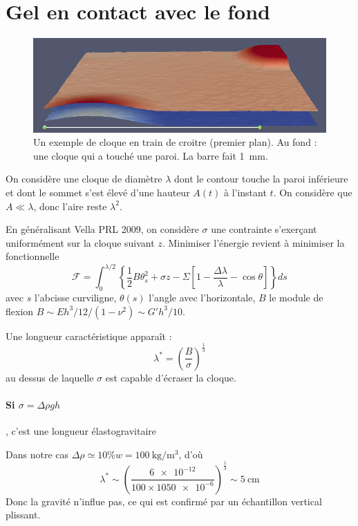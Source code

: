 \documentclass[12pt,a4paper]{article}
\author{Mathieu Leocmach}
\begin{document}
\section{Gel en contact avec le fond}

\begin{figure}
\includegraphics[width=\textwidth]{plots_0117.png}
\caption{Un exemple de cloque en train de croitre (premier plan). Au fond : une cloque qui a touché une paroi. La barre fait \SI{1}{\milli\metre}.}
\end{figure}

On considère une cloque de diamètre $\lambda$ dont le contour touche la paroi inférieure et dont le sommet s'est élevé d'une hauteur $A(t)$ à l'instant $t$. On considère que $A \ll \lambda$, donc l'aire reste $\lambda^2$.

En généralisant Vella PRL 2009, on considère $\sigma$ une contrainte s'exerçant uniformément sur la cloque suivant $z$. Minimiser l'énergie revient à minimiser la fonctionnelle
\begin{equation}
\mathcal{F} = \int_0^{\lambda/2}\left\lbrace\frac{1}{2} B \theta_s^2 + \sigma z - \Sigma \left[1-\frac{\Delta \lambda}{\lambda} - \cos\theta\right] \right\rbrace ds
\end{equation}
avec $s$ l'abcisse curviligne, $\theta(s)$ l'angle avec l'horizontale, $B$ le module de flexion $B \sim E h^3 /12 / (1-\nu^2) \sim G' h^3/10$.

Une longueur caractéristique apparaît :
\begin{equation}
\lambda^* = \left(\frac{B}{\sigma}\right)^\frac{1}{3}
\label{eq:lstar}
\end{equation}
au dessus de laquelle $\sigma$ est capable d'écraser la cloque.

\paragraph*{Si $\sigma = \Delta\rho g h$}, c'est une longueur élastogravitaire

Dans notre cas $\Delta\rho\simeq 10\%w = \SI{100}{\kilo\gram\per\metre^3}$, d'où
\begin{equation}
\lambda^* \sim \left(\frac{\num{6e-12}}{100\times 10 \num{50e-6}}\right)^\frac{1}{3} \sim \SI{5}{\centi\metre}
\end{equation}
Donc la gravité n'influe pas, ce qui est confirmé par un échantillon vertical plissant.
\end{document}
